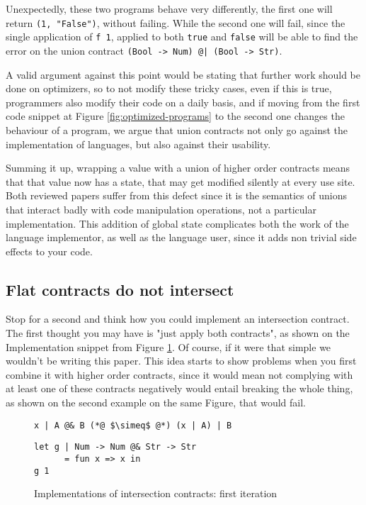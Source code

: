 \documentclass[sigplan,10pt,review,anonymous]{acmart}
\newcommand{\nickel}[1]{\lstinline[language=nickel]{#1}}
\begin{document}
Unexpectedly, these two programs behave very differently, the first one will
return \nickel{(1, "False")}, without failing.  While the second one will fail,
since the single application of \nickel{f 1}, applied to both \nickel{true} and
\nickel{false} will be able to find the error on the union contract
\nickel{(Bool -> Num) @| (Bool -> Str)}.

A valid argument against this point would be stating that further work should be done
on optimizers, so to not modify these tricky cases, even if this is true,
programmers also modify their code on a daily basis, and if moving from the first
code snippet at Figure \ref{fig:optimized-programs} to the second one changes
the behaviour of a program, we argue that union contracts not only go against the
implementation of languages, but also against their usability.

Summing it up, wrapping a value with a union of higher order contracts means that
that value now has a state, that may get modified silently at every use site.
Both reviewed papers suffer from this defect since it is the semantics
of unions that interact badly with code manipulation operations,
not a particular implementation.
This addition of global state complicates both the work of the language
implementor, as well as the language user, since it adds non trivial
side effects to your code.


\subsection*{Flat contracts do not intersect}
\label{sec:flat-and-inter}

Stop for a second and think how you could implement an intersection
contract. The first thought you may have is "just apply
both contracts", as shown on the Implementation snippet
from Figure \ref{fig:inter-contracts}.
Of course, if it were that simple we wouldn't be writing this paper.
This idea starts to show problems when you first combine it with
higher order contracts, since it would mean not complying with
at least one of these contracts negatively would entail breaking the
whole thing, as shown on the second example on the same Figure,
that would fail.

\begin{figure}[h]
\begin{lstlisting}[language=nickel, title=Implementation]
x | A @& B (*@ $\simeq$ @*) (x | A) | B
\end{lstlisting}
\begin{lstlisting}[language=nickel, title=Problem]
let g | Num -> Num @& Str -> Str
      = fun x => x in
g 1
\end{lstlisting}
\caption{Implementations of intersection contracts: first iteration}
\label{fig:inter-contracts}
\end{figure}
\end{document}
